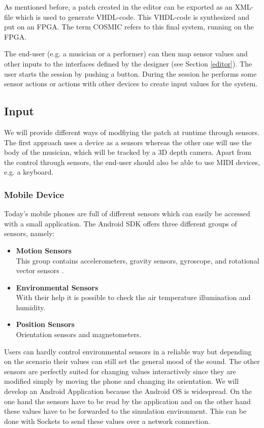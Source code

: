 	As mentioned before, a patch created in the editor can be exported as an XML-file which is used to generate VHDL-code. 
	This VHDL-code is synthesized and put on an \ac{FPGA}. 
	The term \ac{COSMIC} refers to this final system, running on the \ac{FPGA}.
	
	The end-user (e.g. a musician or a performer) can then map sensor values and other inputs to the interfaces defined by the designer (see Section \ref{editor}). 
	The user starts the session by pushing a button. 
	During the session he performs some sensor actions or actions with other devices to create input values for the system.
	
\subsection{Input}
We will provide different ways of modfiying the patch at runtime through sensors. 
The first approach uses a device as a sensors whereas the other one will use the body of the musician, which will be tracked by a 3D depth camera. 
Apart from the control through sensors, the end-user should also be able to use MIDI devices, e.g. a keyboard.

\subsubsection{Mobile Device}
Today's mobile phones are full of different sensors which can easily be accessed with a small application. The Android SDK offers three different groups of sensors, namely:
\begin{itemize}
	\item \textbf{Motion Sensors} \\
			This group contains accelerometers, gravity sensors, gyroscope, and rotational vector sensors .
	\item \textbf{Environmental Sensors} \\
			With their help it is possible to check the air temperature illumination and humidity.
	\item \textbf{Position Sensors} \\
			Orientation sensors and magnetometers.
\end{itemize}

Users can hardly control environmental sensors in a reliable way but depending on the scenario their values can still set the general mood of the sound.
The other sensors are perfectly suited for changing values interactively since they are modified simply by moving the phone and changing its orientation. 
We will develop an Android Application because the Android OS is widespread. 
On the one hand the sensors have to be read by the application and on the other hand these values have to be forwarded to the simulation environment. 
This can be done with Sockets to send these values over a network connection.

